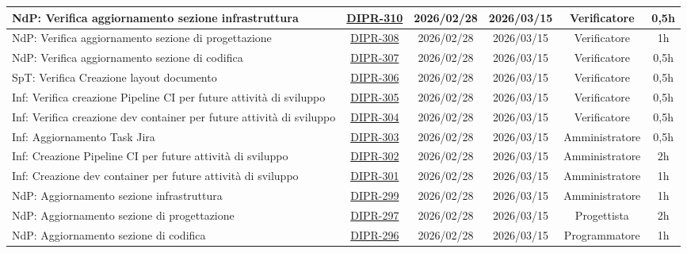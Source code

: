 \documentclass[a4paper,12pt]{article}
\begin{document}
\begin{spacing}{1}
\begin{longtable}{|p{4cm}|c|c|c|c|c|}
        \hline
        NdP: Verifica aggiornamento sezione infrastruttura & \href{https://7zpus.atlassian.net/browse/DIPR-310}{DIPR-310} & 2026/02/28 & 2026/03/15 & Verificatore & 0,5h \\
        \hline
        NdP: Verifica aggiornamento sezione di progettazione & \href{https://7zpus.atlassian.net/browse/DIPR-308}{DIPR-308} & 2026/02/28 & 2026/03/15 & Verificatore & 1h \\
        \hline
        NdP: Verifica aggiornamento sezione di codifica & \href{https://7zpus.atlassian.net/browse/DIPR-307}{DIPR-307} & 2026/02/28 & 2026/03/15 & Verificatore & 0,5h \\
        \hline
        SpT: Verifica Creazione layout documento & \href{https://7zpus.atlassian.net/browse/DIPR-306}{DIPR-306} & 2026/02/28 & 2026/03/15 & Verificatore & 0,5h \\
        \hline
        Inf: Verifica creazione Pipeline CI per future attività di sviluppo & \href{https://7zpus.atlassian.net/browse/DIPR-305}{DIPR-305} & 2026/02/28 & 2026/03/15 & Verificatore & 0,5h \\
        \hline
        Inf: Verifica creazione dev container per future attività di sviluppo & \href{https://7zpus.atlassian.net/browse/DIPR-304}{DIPR-304} & 2026/02/28 & 2026/03/15 & Verificatore & 0,5h \\
        \hline
        Inf: Aggiornamento Task Jira & \href{https://7zpus.atlassian.net/browse/DIPR-303}{DIPR-303} & 2026/02/28 & 2026/03/15 & Amministratore & 0,5h \\
        \hline
        Inf: Creazione Pipeline CI per future attività di sviluppo & \href{https://7zpus.atlassian.net/browse/DIPR-302}{DIPR-302} & 2026/02/28 & 2026/03/15 & Amministratore & 2h \\
        \hline
        Inf: Creazione dev container per future attività di sviluppo & \href{https://7zpus.atlassian.net/browse/DIPR-301}{DIPR-301} & 2026/02/28 & 2026/03/15 & Amministratore & 1h \\
        \hline
        NdP: Aggiornamento sezione infrastruttura & \href{https://7zpus.atlassian.net/browse/DIPR-299}{DIPR-299} & 2026/02/28 & 2026/03/15 & Amministratore & 1h \\
        \hline
        NdP: Aggiornamento sezione di progettazione & \href{https://7zpus.atlassian.net/browse/DIPR-297}{DIPR-297} & 2026/02/28 & 2026/03/15 & Progettista & 2h \\
        \hline
        NdP: Aggiornamento sezione di codifica & \href{https://7zpus.atlassian.net/browse/DIPR-296}{DIPR-296} & 2026/02/28 & 2026/03/15 & Programmatore & 1h \\

\end{longtable}
\end{spacing}
\end{document}

